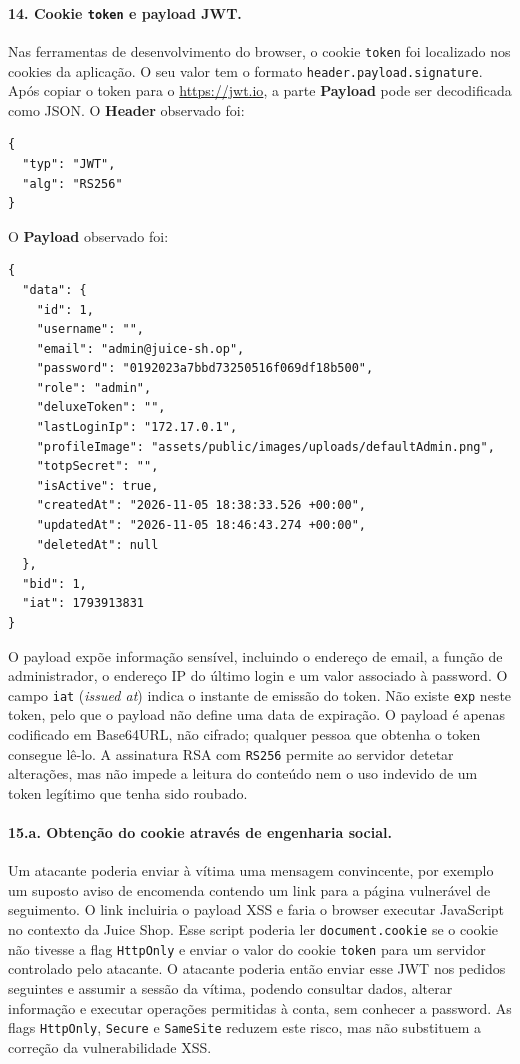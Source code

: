 \documentclass[11pt,a4paper]{article}
\begin{document}
\paragraph{14. Cookie \texttt{token} e payload JWT.}
Nas ferramentas de desenvolvimento do browser, o cookie \texttt{token} foi localizado nos cookies
da aplicação. O seu valor tem o formato \texttt{header.payload.signature}. Após copiar o token
para o \url{https://jwt.io}, a parte \textbf{Payload} pode ser decodificada como JSON. O
\textbf{Header} observado foi:
\begin{lstlisting}
{
  "typ": "JWT",
  "alg": "RS256"
}
\end{lstlisting}
O \textbf{Payload} observado foi:
\begin{lstlisting}
{
  "data": {
    "id": 1,
    "username": "",
    "email": "admin@juice-sh.op",
    "password": "0192023a7bbd73250516f069df18b500",
    "role": "admin",
    "deluxeToken": "",
    "lastLoginIp": "172.17.0.1",
    "profileImage": "assets/public/images/uploads/defaultAdmin.png",
    "totpSecret": "",
    "isActive": true,
    "createdAt": "2026-11-05 18:38:33.526 +00:00",
    "updatedAt": "2026-11-05 18:46:43.274 +00:00",
    "deletedAt": null
  },
  "bid": 1,
  "iat": 1793913831
}
\end{lstlisting}
O payload expõe informação sensível, incluindo o endereço de email, a função de administrador, o
endereço IP do último login e um valor associado à password. O campo \texttt{iat}
(\textit{issued at}) indica o instante de emissão do token. Não existe \texttt{exp} neste token,
pelo que o payload não define uma data de expiração. O payload é apenas codificado em Base64URL,
não cifrado; qualquer pessoa que obtenha o token consegue lê-lo. A assinatura RSA com
\texttt{RS256} permite ao servidor detetar alterações, mas não impede a leitura do conteúdo nem o
uso indevido de um token legítimo que tenha sido roubado.

\paragraph{15.a. Obtenção do cookie através de engenharia social.}
Um atacante poderia enviar à vítima uma mensagem convincente, por exemplo um suposto aviso de
encomenda contendo um link para a página vulnerável de seguimento. O link incluiria o payload XSS
e faria o browser executar JavaScript no contexto da Juice Shop. Esse script poderia ler
\texttt{document.cookie} se o cookie não tivesse a flag \texttt{HttpOnly} e enviar o valor do
cookie \texttt{token} para um servidor controlado pelo atacante. O atacante poderia então enviar
esse JWT nos pedidos seguintes e assumir a sessão da vítima, podendo consultar dados, alterar
informação e executar operações permitidas à conta, sem conhecer a password. As flags
\texttt{HttpOnly}, \texttt{Secure} e \texttt{SameSite} reduzem este risco, mas não substituem a
correção da vulnerabilidade XSS.
\end{document}
